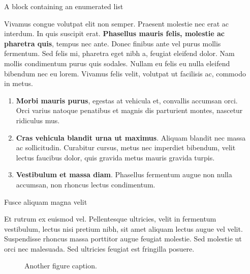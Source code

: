 \begin{frame}[t]
\begin{columns}[t]
\begin{column}{\colwidth}
\end{column}

\separatorcolumn

\begin{column}{\colwidth}

  \begin{block}{A block containing an enumerated list}

    Vivamus congue volutpat elit non semper. Praesent molestie nec erat ac
    interdum. In quis suscipit erat. \textbf{Phasellus mauris felis, molestie
    ac pharetra quis}, tempus nec ante. Donec finibus ante vel purus mollis
    fermentum. Sed felis mi, pharetra eget nibh a, feugiat eleifend dolor. Nam
    mollis condimentum purus quis sodales. Nullam eu felis eu nulla eleifend
    bibendum nec eu lorem. Vivamus felis velit, volutpat ut facilisis ac,
    commodo in metus.

    \begin{enumerate}
      \item \textbf{Morbi mauris purus}, egestas at vehicula et, convallis
        accumsan orci. Orci varius natoque penatibus et magnis dis parturient
        montes, nascetur ridiculus mus.
      \item \textbf{Cras vehicula blandit urna ut maximus}. Aliquam blandit nec
        massa ac sollicitudin. Curabitur cursus, metus nec imperdiet bibendum,
        velit lectus faucibus dolor, quis gravida metus mauris gravida turpis.
      \item \textbf{Vestibulum et massa diam}. Phasellus fermentum augue non
        nulla accumsan, non rhoncus lectus condimentum.
    \end{enumerate}

  \end{block}

  \begin{block}{Fusce aliquam magna velit}

    Et rutrum ex euismod vel. Pellentesque ultricies, velit in fermentum
    vestibulum, lectus nisi pretium nibh, sit amet aliquam lectus augue vel
    velit. Suspendisse rhoncus massa porttitor augue feugiat molestie. Sed
    molestie ut orci nec malesuada. Sed ultricies feugiat est fringilla
    posuere.

    \begin{figure}
      \centering
      \caption{Another figure caption.}
    \end{figure}


\end{block}
\end{column}
\end{columns}
\end{frame}
